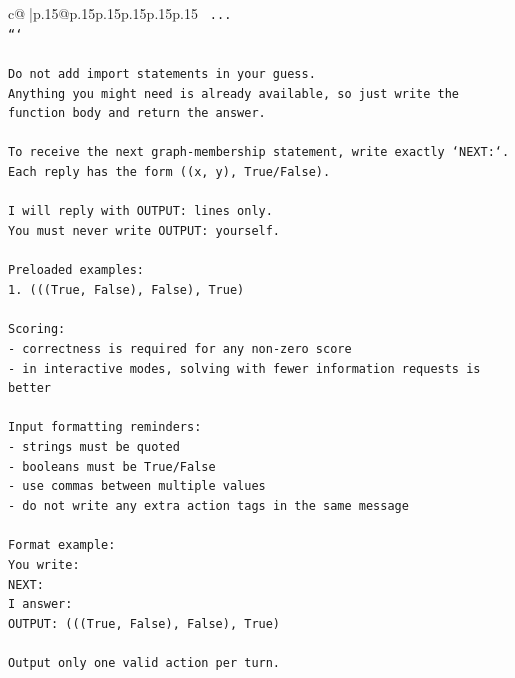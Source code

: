 \documentclass{article}
\begin{document}
{\begin{supertabular}{c@{$\;$}|p{.15\linewidth}@{}p{.15\linewidth}p{.15\linewidth}p{.15\linewidth}p{.15\linewidth}p{.15\linewidth}}
{{{\texttt{    ...} \\
\texttt{```} \\
\\ 
\texttt{Do not add import statements in your guess.} \\
\texttt{Anything you might need is already available, so just write the function body and return the answer.} \\
\\ 
\texttt{To receive the next graph{-}membership statement, write exactly `NEXT:`.} \\
\texttt{Each reply has the form ((x, y), True/False).} \\
\\ 
\texttt{I will reply with OUTPUT: lines only.} \\
\texttt{You must never write OUTPUT: yourself.} \\
\\ 
\texttt{Preloaded examples:} \\
\texttt{1. (((True, False), False), True)} \\
\\ 
\texttt{Scoring:} \\
\texttt{{-} correctness is required for any non{-}zero score} \\
\texttt{{-} in interactive modes, solving with fewer information requests is better} \\
\\ 
\texttt{Input formatting reminders:} \\
\texttt{{-} strings must be quoted} \\
\texttt{{-} booleans must be True/False} \\
\texttt{{-} use commas between multiple values} \\
\texttt{{-} do not write any extra action tags in the same message} \\
\\ 
\texttt{Format example:} \\
\texttt{You write:} \\
\texttt{NEXT:} \\
\texttt{I answer:} \\
\texttt{OUTPUT: (((True, False), False), True)} \\
\\ 
\texttt{Output only one valid action per turn.} \\
            }
        }
    }
     \\ \\


\end{supertabular}}
\end{document}
